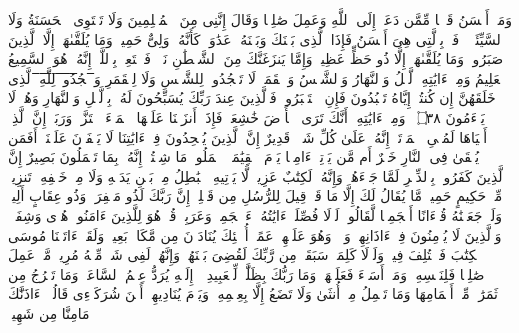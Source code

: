 \startbuffer[\q:41:33]
وَمَنۡ أَحۡسَنُ قَوۡلࣰا مِّمَّن دَعَاۤ إِلَى ٱللَّهِ وَعَمِلَ صَٰلِحࣰا وَقَالَ إِنَّنِی مِنَ ٱلۡمُسۡلِمِینَ%
\stopbuffer%
\startbuffer[\q:41:34]
وَلَا تَسۡتَوِی ٱلۡحَسَنَةُ وَلَا ٱلسَّیِّئَةُۚ ٱدۡفَعۡ بِٱلَّتِی هِیَ أَحۡسَنُ فَإِذَا ٱلَّذِی بَیۡنَكَ وَبَیۡنَهُۥ عَدَٰوَةࣱ كَأَنَّهُۥ وَلِیٌّ حَمِیمࣱ%
\stopbuffer%
\startbuffer[\q:41:35]
وَمَا یُلَقَّىٰهَاۤ إِلَّا ٱلَّذِینَ صَبَرُوا۟ وَمَا یُلَقَّىٰهَاۤ إِلَّا ذُو حَظٍّ عَظِیمࣲ%
\stopbuffer%
\startbuffer[\q:41:36]
وَإِمَّا یَنزَغَنَّكَ مِنَ ٱلشَّیۡطَٰنِ نَزۡغࣱ فَٱسۡتَعِذۡ بِٱللَّهِۖ إِنَّهُۥ هُوَ ٱلسَّمِیعُ ٱلۡعَلِیمُ%
\stopbuffer%
\startbuffer[\q:41:37]
وَمِنۡ ءَایَٰتِهِ ٱلَّیۡلُ وَٱلنَّهَارُ وَٱلشَّمۡسُ وَٱلۡقَمَرُۚ لَا تَسۡجُدُوا۟ لِلشَّمۡسِ وَلَا لِلۡقَمَرِ وَ̅ٱ̅سۡ̅جُ̅دُ̅و̅ا۟̅ ̅لِ̅لَّ̅هِ̅ ٱلَّذِی خَلَقَهُنَّ إِن كُنتُمۡ إِیَّاهُ تَعۡبُدُونَ%
\stopbuffer%
\startbuffer[\q:41:38]
فَإِنِ ٱسۡتَكۡبَرُوا۟ فَٱلَّذِینَ عِندَ رَبِّكَ یُسَبِّحُونَ لَهُۥ بِٱلَّیۡلِ وَٱلنَّهَارِ وَهُمۡ لَا یَسۡءَمُونَ ۝٣٨ ۩%
\stopbuffer%
\startbuffer[\q:41:39]
وَمِنۡ ءَایَٰتِهِۦۤ أَنَّكَ تَرَى ٱلۡأَرۡضَ خَٰشِعَةࣰ فَإِذَاۤ أَنزَلۡنَا عَلَیۡهَا ٱلۡمَاۤءَ ٱهۡتَزَّتۡ وَرَبَتۡۚ إِنَّ ٱلَّذِیۤ أَحۡیَاهَا لَمُحۡیِ ٱلۡمَوۡتَىٰۤۚ إِنَّهُۥ عَلَىٰ كُلِّ شَیۡءࣲ قَدِیرٌ%
\stopbuffer%
\startbuffer[\q:41:40]
إِنَّ ٱلَّذِینَ یُلۡحِدُونَ فِیۤ ءَایَٰتِنَا لَا یَخۡفَوۡنَ عَلَیۡنَاۤۗ أَفَمَن یُلۡقَىٰ فِی ٱلنَّارِ خَیۡرٌ أَم مَّن یَأۡتِیۤ ءَامِنࣰا یَوۡمَ ٱلۡقِیَٰمَةِۚ ٱعۡمَلُوا۟ مَا شِئۡتُمۡ إِنَّهُۥ بِمَا تَعۡمَلُونَ بَصِیرٌ%
\stopbuffer%
\startbuffer[\q:41:41]
إِنَّ ٱلَّذِینَ كَفَرُوا۟ بِٱلذِّكۡرِ لَمَّا جَاۤءَهُمۡۖ وَإِنَّهُۥ لَكِتَٰبٌ عَزِیزࣱ%
\stopbuffer%
\startbuffer[\q:41:42]
لَّا یَأۡتِیهِ ٱلۡبَٰطِلُ مِنۢ بَیۡنِ یَدَیۡهِ وَلَا مِنۡ خَلۡفِهِۦۖ تَنزِیلࣱ مِّنۡ حَكِیمٍ حَمِیدࣲ%
\stopbuffer%
\startbuffer[\q:41:43]
مَّا یُقَالُ لَكَ إِلَّا مَا قَدۡ قِیلَ لِلرُّسُلِ مِن قَبۡلِكَۚ إِنَّ رَبَّكَ لَذُو مَغۡفِرَةࣲ وَذُو عِقَابٍ أَلِیمࣲ%
\stopbuffer%
\startbuffer[\q:41:44]
وَلَوۡ جَعَلۡنَٰهُ قُرۡءَانًا أَعۡجَمِیࣰّا لَّقَالُوا۟ لَوۡلَا فُصِّلَتۡ ءَایَٰتُهُۥۤۖ ءَا۬عۡجَمِیࣱّ وَعَرَبِیࣱّۗ قُلۡ هُوَ لِلَّذِینَ ءَامَنُوا۟ هُدࣰى وَشِفَاۤءࣱۚ وَٱلَّذِینَ لَا یُؤۡمِنُونَ فِیۤ ءَاذَانِهِمۡ وَقۡرࣱ وَهُوَ عَلَیۡهِمۡ عَمًىۚ أُو۟لَٰۤئِكَ یُنَادَوۡنَ مِن مَّكَانِۭ بَعِیدࣲ%
\stopbuffer%
\startbuffer[\q:41:45]
وَلَقَدۡ ءَاتَیۡنَا مُوسَى ٱلۡكِتَٰبَ فَٱخۡتُلِفَ فِیهِۚ وَلَوۡلَا كَلِمَةࣱ سَبَقَتۡ مِن رَّبِّكَ لَقُضِیَ بَیۡنَهُمۡۚ وَإِنَّهُمۡ لَفِی شَكࣲّ مِّنۡهُ مُرِیبࣲ%
\stopbuffer%
\startbuffer[\q:41:46]
مَّنۡ عَمِلَ صَٰلِحࣰا فَلِنَفۡسِهِۦۖ وَمَنۡ أَسَاۤءَ فَعَلَیۡهَاۗ وَمَا رَبُّكَ بِظَلَّٰمࣲ لِّلۡعَبِیدِ%
\stopbuffer%
\startbuffer[\q:41:47]
۞ إِلَیۡهِ یُرَدُّ عِلۡمُ ٱلسَّاعَةِۚ وَمَا تَخۡرُجُ مِن ثَمَرَٰتࣲ مِّنۡ أَكۡمَامِهَا وَمَا تَحۡمِلُ مِنۡ أُنثَىٰ وَلَا تَضَعُ إِلَّا بِعِلۡمِهِۦۚ وَیَوۡمَ یُنَادِیهِمۡ أَیۡنَ شُرَكَاۤءِی قَالُوۤا۟ ءَاذَنَّٰكَ مَامِنَّا مِن شَهِیدࣲ%
